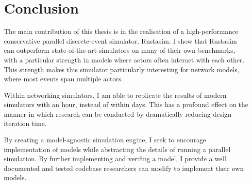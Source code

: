 \chapter{Conclusion} \label{conclusion}

The main contribution of this thesis is in the realisation of a high-performance conservative parallel discrete-event simulator, Rustasim.
I show that Rustasim can outperform state-of-the-art simulators on many of their own benchmarks, with a particular strength in models where actors often interact with each other.
This strength makes this simulator particularly interesting for network models, where most events span multiple actors.

Within networking simulators, I am able to replicate the results of modern simulators with an hour, instead of within days.
This has a profound effect on the manner in which research can be conducted by dramatically reducing design iteration time.

By creating a model-agnostic simulation engine, I seek to encourage implementation of models while abstracting the details of running a parallel simulation.
By further implementing and verifing a \datacenter model, I provide a well documented and tested codebase researchers can modify to implement their own models.
